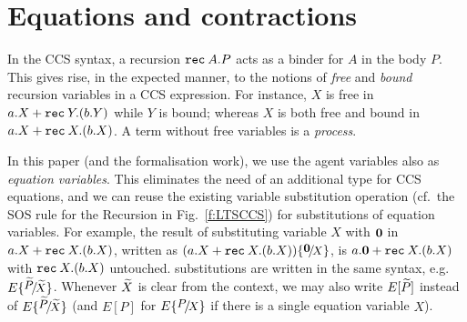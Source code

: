\section{Equations and contractions}
\label{s:eq}

In the CCS syntax, 
a recursion ${\tt rec}\: A . P$ acts as a binder for $A$ in the body $P$. 
This gives rise, in the expected manner, to the notions of 
\emph{free} and \emph{bound} recursion variables in a CCS expression. 
For instance,  $X$ is free in $a.X + {\tt rec}\: Y . (b.Y)$ while $Y$
is bound; whereas 
$X$ is both free and bound 
 in $a.X + {\tt rec}\: X . (b.X)$.
A term without free variables is  a \emph{process}.

In this paper (and the formalisation work), we use the agent
variables also as \emph{equation variables}. This eliminates the need of
an additional type for CCS equations, and we can reuse the existing
variable substitution operation (cf.~the SOS rule for the Recursion in
Fig.~\ref{f:LTSCCS}) for substitutions of equation variables.
For example, the result of substituting  variable $X$ with ${\boldsymbol 0}$ in $a.X +
{\tt rec}\: X . (b.X)$,  written as $(a.X + \recu X (b.X)) \sub {\nil} X$, is
$a.{\boldsymbol 0} + {\tt rec}\: X . (b.X)$ with ${\tt rec}\: X . (b.X)$
untouched. \Multivariate substitutions are written in the same syntax,
e.g. $E \sub {\til P} {\til X}$. Whenever $\widetilde X$ is clear from the
context, we may also write $E[\widetilde P]$ instead of $E \sub {\til P} {\til
  X}$ (and $E[P]$ for $E \sub P X$ if there is a single equation
variable $X$). 

 
